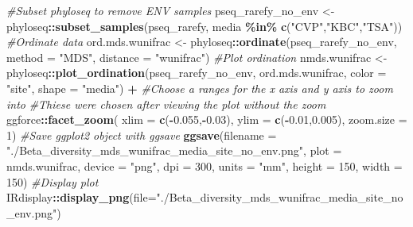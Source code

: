 \documentclass[
]{book}
\newenvironment{Shaded}{\begin{snugshade}}{\end{snugshade}}
\newcommand{\AttributeTok}[1]{\textcolor[rgb]{0.13,0.29,0.53}{#1}}
\newcommand{\CommentTok}[1]{\textcolor[rgb]{0.56,0.35,0.01}{\textit{#1}}}
\newcommand{\DecValTok}[1]{\textcolor[rgb]{0.00,0.00,0.81}{#1}}
\newcommand{\FloatTok}[1]{\textcolor[rgb]{0.00,0.00,0.81}{#1}}
\newcommand{\FunctionTok}[1]{\textcolor[rgb]{0.13,0.29,0.53}{\textbf{#1}}}
\newcommand{\NormalTok}[1]{#1}
\newcommand{\OtherTok}[1]{\textcolor[rgb]{0.56,0.35,0.01}{#1}}
\newcommand{\SpecialCharTok}[1]{\textcolor[rgb]{0.81,0.36,0.00}{\textbf{#1}}}
\newcommand{\StringTok}[1]{\textcolor[rgb]{0.31,0.60,0.02}{#1}}
\begin{document}
\begin{Shaded}
\begin{Highlighting}[]
\CommentTok{\#Subset phyloseq to remove ENV samples}
\NormalTok{pseq\_rarefy\_no\_env }\OtherTok{\textless{}{-}}\NormalTok{ phyloseq}\SpecialCharTok{::}\FunctionTok{subset\_samples}\NormalTok{(pseq\_rarefy, media }\SpecialCharTok{\%in\%} \FunctionTok{c}\NormalTok{(}\StringTok{"CVP"}\NormalTok{,}\StringTok{"KBC"}\NormalTok{,}\StringTok{"TSA"}\NormalTok{))}
\CommentTok{\#Ordinate data}
\NormalTok{ord.mds.wunifrac }\OtherTok{\textless{}{-}}\NormalTok{ phyloseq}\SpecialCharTok{::}\FunctionTok{ordinate}\NormalTok{(pseq\_rarefy\_no\_env, }\AttributeTok{method =} \StringTok{"MDS"}\NormalTok{, }\AttributeTok{distance =} \StringTok{"wunifrac"}\NormalTok{)}
\CommentTok{\#Plot ordination}
\NormalTok{nmds.wunifrac }\OtherTok{\textless{}{-}}\NormalTok{ phyloseq}\SpecialCharTok{::}\FunctionTok{plot\_ordination}\NormalTok{(pseq\_rarefy\_no\_env, ord.mds.wunifrac,}
                                   \AttributeTok{color =} \StringTok{"site"}\NormalTok{, }\AttributeTok{shape =} \StringTok{"media"}\NormalTok{) }\SpecialCharTok{+}
                  \CommentTok{\#Choose a ranges for the x axis and y axis to zoom into}
                  \CommentTok{\#Thiese were chosen after viewing the plot without the zoom}
\NormalTok{                  ggforce}\SpecialCharTok{::}\FunctionTok{facet\_zoom}\NormalTok{( }\AttributeTok{xlim =} \FunctionTok{c}\NormalTok{(}\SpecialCharTok{{-}}\FloatTok{0.055}\NormalTok{,}\SpecialCharTok{{-}}\FloatTok{0.03}\NormalTok{), }\AttributeTok{ylim =} \FunctionTok{c}\NormalTok{(}\SpecialCharTok{{-}}\FloatTok{0.01}\NormalTok{,}\FloatTok{0.005}\NormalTok{), }\AttributeTok{zoom.size =} \DecValTok{1}\NormalTok{)}
\CommentTok{\#Save ggplot2 object with ggsave}
\FunctionTok{ggsave}\NormalTok{(}\AttributeTok{filename =} \StringTok{"./Beta\_diversity\_mds\_wunifrac\_media\_site\_no\_env.png"}\NormalTok{, }\AttributeTok{plot =}\NormalTok{ nmds.wunifrac,}
       \AttributeTok{device =} \StringTok{"png"}\NormalTok{, }\AttributeTok{dpi =} \DecValTok{300}\NormalTok{, }\AttributeTok{units =} \StringTok{"mm"}\NormalTok{, }\AttributeTok{height =} \DecValTok{150}\NormalTok{, }\AttributeTok{width =} \DecValTok{150}\NormalTok{)}
\CommentTok{\#Display plot}
\NormalTok{IRdisplay}\SpecialCharTok{::}\FunctionTok{display\_png}\NormalTok{(}\AttributeTok{file=}\StringTok{"./Beta\_diversity\_mds\_wunifrac\_media\_site\_no\_env.png"}\NormalTok{)}
\end{Highlighting}
\end{Shaded}
\end{document}
